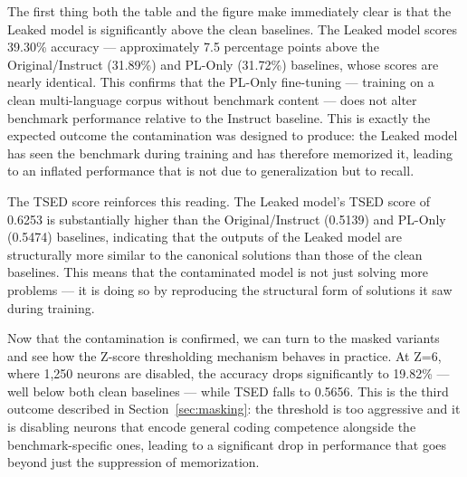 \documentclass[mscthesis]{usiinfthesis}
\begin{document}
 
The first thing both the table and the figure make immediately clear is that the Leaked model is significantly above the clean baselines.
The Leaked model scores 39.30\% accuracy --- approximately 7.5 percentage points above
the Original/Instruct (31.89\%) and PL-Only (31.72\%) baselines, whose scores are nearly identical.
This confirms that the PL-Only fine-tuning --- training on a clean multi-language corpus without benchmark content --- does not alter benchmark performance relative to the Instruct baseline.
This is exactly the expected outcome the contamination was designed to produce: the Leaked model has seen the benchmark during training and has therefore memorized it, leading to an inflated performance that is not due to generalization but to recall.
\par\vspace{1em}
The TSED score reinforces this reading. The Leaked model's TSED score of 0.6253 is substantially higher than the Original/Instruct (0.5139) and PL-Only (0.5474) baselines, indicating that the outputs of the Leaked model are structurally more similar to the canonical solutions than those of the clean baselines.
This means that the contaminated model is not just solving more problems --- it is doing so by reproducing
the structural form of solutions it saw during training.
\par\vspace{1em}
Now that the contamination is confirmed, we can turn to the masked variants and see how the Z-score thresholding mechanism behaves in practice.
At Z=6, where 1,250 neurons are disabled, the accuracy drops significantly to 19.82\% --- well below both clean baselines --- while TSED falls
to 0.5656. This is the third outcome described in Section~\ref{sec:masking}: the threshold
is too aggressive and it is disabling neurons that encode general coding competence alongside the
benchmark-specific ones, leading to a significant drop in performance that goes beyond just the suppression of memorization.
\par\vspace{1em}
\end{document}
